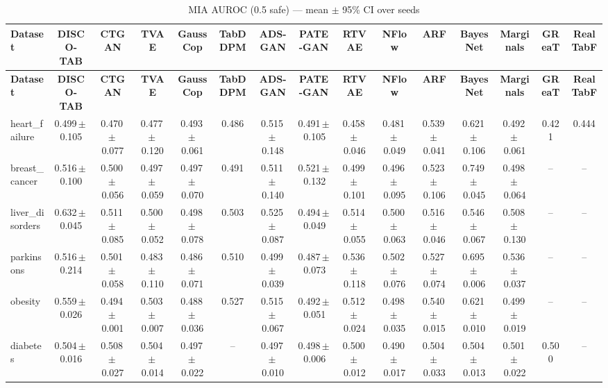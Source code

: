 \documentclass[8pt]{extarticle}
\begin{document}
\begin{longtable}{l*{14}{c}}
\caption{MIA AUROC (0.5 safe) --- mean $\pm$ 95\% CI over seeds}\\
\toprule
\textbf{Dataset} & \textbf{DISCO-TAB} & \textbf{CTGAN} & \textbf{TVAE} & \textbf{GaussCop} & \textbf{TabDDPM} & \textbf{ADS-GAN} & \textbf{PATE-GAN} & \textbf{RTVAE} & \textbf{NFlow} & \textbf{ARF} & \textbf{BayesNet} & \textbf{Marginals} & \textbf{GReaT} & \textbf{RealTabF} \\
\midrule
\endfirsthead
\toprule
\textbf{Dataset} & \textbf{DISCO-TAB} & \textbf{CTGAN} & \textbf{TVAE} & \textbf{GaussCop} & \textbf{TabDDPM} & \textbf{ADS-GAN} & \textbf{PATE-GAN} & \textbf{RTVAE} & \textbf{NFlow} & \textbf{ARF} & \textbf{BayesNet} & \textbf{Marginals} & \textbf{GReaT} & \textbf{RealTabF} \\
\midrule
\endhead
\bottomrule
\endfoot
heart\_failure & 0.499\,$\pm$\,0.105 & 0.470\,$\pm$\,0.077 & 0.477\,$\pm$\,0.120 & 0.493\,$\pm$\,0.061 & 0.486 & 0.515\,$\pm$\,0.148 & 0.491\,$\pm$\,0.105 & 0.458\,$\pm$\,0.046 & 0.481\,$\pm$\,0.049 & 0.539\,$\pm$\,0.041 & 0.621\,$\pm$\,0.106 & 0.492\,$\pm$\,0.061 & 0.421 & 0.444 \\
breast\_cancer & 0.516\,$\pm$\,0.100 & 0.500\,$\pm$\,0.056 & 0.497\,$\pm$\,0.059 & 0.497\,$\pm$\,0.070 & 0.491 & 0.511\,$\pm$\,0.140 & 0.521\,$\pm$\,0.132 & 0.499\,$\pm$\,0.101 & 0.496\,$\pm$\,0.095 & 0.523\,$\pm$\,0.106 & 0.749\,$\pm$\,0.045 & 0.498\,$\pm$\,0.064 & -- & -- \\
liver\_disorders & 0.632\,$\pm$\,0.045 & 0.511\,$\pm$\,0.085 & 0.500\,$\pm$\,0.052 & 0.498\,$\pm$\,0.078 & 0.503 & 0.525\,$\pm$\,0.087 & 0.494\,$\pm$\,0.049 & 0.514\,$\pm$\,0.055 & 0.500\,$\pm$\,0.063 & 0.516\,$\pm$\,0.046 & 0.546\,$\pm$\,0.067 & 0.508\,$\pm$\,0.130 & -- & -- \\
parkinsons & 0.516\,$\pm$\,0.214 & 0.501\,$\pm$\,0.058 & 0.483\,$\pm$\,0.110 & 0.486\,$\pm$\,0.071 & 0.510 & 0.499\,$\pm$\,0.039 & 0.487\,$\pm$\,0.073 & 0.536\,$\pm$\,0.118 & 0.502\,$\pm$\,0.076 & 0.527\,$\pm$\,0.074 & 0.695\,$\pm$\,0.006 & 0.536\,$\pm$\,0.037 & -- & -- \\
obesity & 0.559\,$\pm$\,0.026 & 0.494\,$\pm$\,0.001 & 0.503\,$\pm$\,0.007 & 0.488\,$\pm$\,0.036 & 0.527 & 0.515\,$\pm$\,0.067 & 0.492\,$\pm$\,0.051 & 0.512\,$\pm$\,0.024 & 0.498\,$\pm$\,0.035 & 0.540\,$\pm$\,0.015 & 0.621\,$\pm$\,0.010 & 0.499\,$\pm$\,0.019 & -- & -- \\
diabetes & 0.504\,$\pm$\,0.016 & 0.508\,$\pm$\,0.027 & 0.504\,$\pm$\,0.014 & 0.497\,$\pm$\,0.022 & -- & 0.497\,$\pm$\,0.010 & 0.498\,$\pm$\,0.006 & 0.500\,$\pm$\,0.012 & 0.490\,$\pm$\,0.017 & 0.504\,$\pm$\,0.033 & 0.504\,$\pm$\,0.013 & 0.501\,$\pm$\,0.022 & 0.500 & -- \\

\end{longtable}
\end{document}
